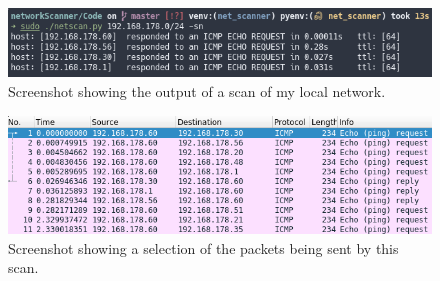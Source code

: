 \documentclass[titlepage]{article}
\begin{document}
\begin{figure}[H]
  \centering
  \includegraphics[width=\textwidth]{screenshots/pingscantest.png}
  \caption{%
    Screenshot showing the output of a scan of my local network.
  }\label{lanscantest}
\end{figure}

\begin{figure}[H]
  \centering
  \includegraphics[width=\textwidth]{screenshots/pingscantest_wireshark.png}
  \caption{%
    Screenshot showing a selection of the packets being sent by this scan.
  }\label{lanscanwireshark}
\end{figure}
\end{document}
